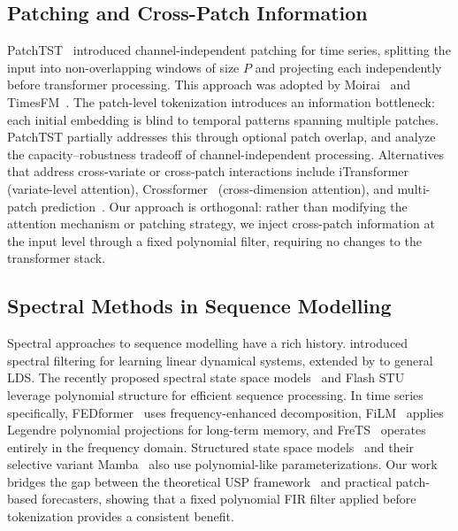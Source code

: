 \documentclass{article}
\begin{document}
\subsection{Patching and Cross-Patch Information}

PatchTST~\citep{nie2023patchtst} introduced channel-independent patching for time series, splitting the input into non-overlapping windows of size $P$ and projecting each independently before transformer processing. This approach was adopted by Moirai~\citep{woo2024unified} and TimesFM~\citep{das2024decoder}. The patch-level tokenization introduces an information bottleneck: each initial embedding is blind to temporal patterns spanning multiple patches. PatchTST partially addresses this through optional patch overlap, and \citet{han2024capacity} analyze the capacity--robustness tradeoff of channel-independent processing. Alternatives that address cross-variate or cross-patch interactions include iTransformer~\citep{liu2024itransformer} (variate-level attention), Crossformer~\citep{zhang2023crossformer} (cross-dimension attention), and multi-patch prediction~\citep{chen2024multi}. Our approach is orthogonal: rather than modifying the attention mechanism or patching strategy, we inject cross-patch information at the input level through a fixed polynomial filter, requiring no changes to the transformer stack.

\subsection{Spectral Methods in Sequence Modelling}

Spectral approaches to sequence modelling have a rich history. \citet{hazan2017learning} introduced spectral filtering for learning linear dynamical systems, extended by \citet{hazan2018spectral} to general LDS. The recently proposed spectral state space models~\citep{agarwal2025spectral} and Flash STU~\citep{dao2024flashstu} leverage polynomial structure for efficient sequence processing. In time series specifically, FEDformer~\citep{zhou2022fedformer} uses frequency-enhanced decomposition, FiLM~\citep{zhou2022film} applies Legendre polynomial projections for long-term memory, and FreTS~\citep{yi2024frequency} operates entirely in the frequency domain. Structured state space models~\citep{gu2022efficiently} and their selective variant Mamba~\citep{gu2024mamba} also use polynomial-like parameterizations. Our work bridges the gap between the theoretical USP framework~\citep{marsden2024universal} and practical patch-based forecasters, showing that a fixed polynomial FIR filter applied before tokenization provides a consistent benefit.
\end{document}
